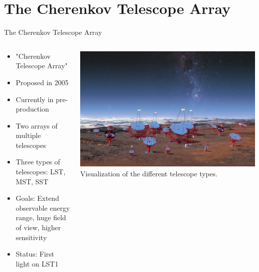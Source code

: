 \section{The Cherenkov Telescope Array}


\begin{frame}{The Cherenkov Telescope Array}
    \begin{columns}[T] %
        \begin{column}{.45\textwidth}
            \vspace{10pt}
            \begin{itemize}
                \item "Cherenkov Telescope Array"
                \item Proposed in 2005
                \item Currently in pre-production
                \item Two arrays of multiple telescopes
                \item Three types of telescopes: LST, MST, SST
                \item Goals: Extend observable energy range, huge field of view, higher sensitivity
                \item Status: First light on LST1
            \end{itemize}
        \end{column}%
        \hfill%
        \begin{column}{.53\textwidth}
            \includegraphics[width=\linewidth]{images/cta_telescopes.jpg}
            Visualization of the different telescope types.
            \cite{cta_telescopes}
        \end{column}%
    \end{columns}
    
\end{frame}


